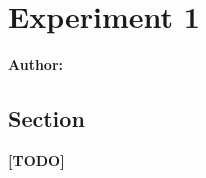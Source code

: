 \chapter{Experiment 1}

\textbf{Author: } 

\section{Section}
\textbf{[TODO]}
\newline
\lipsum[1]

\filbreak